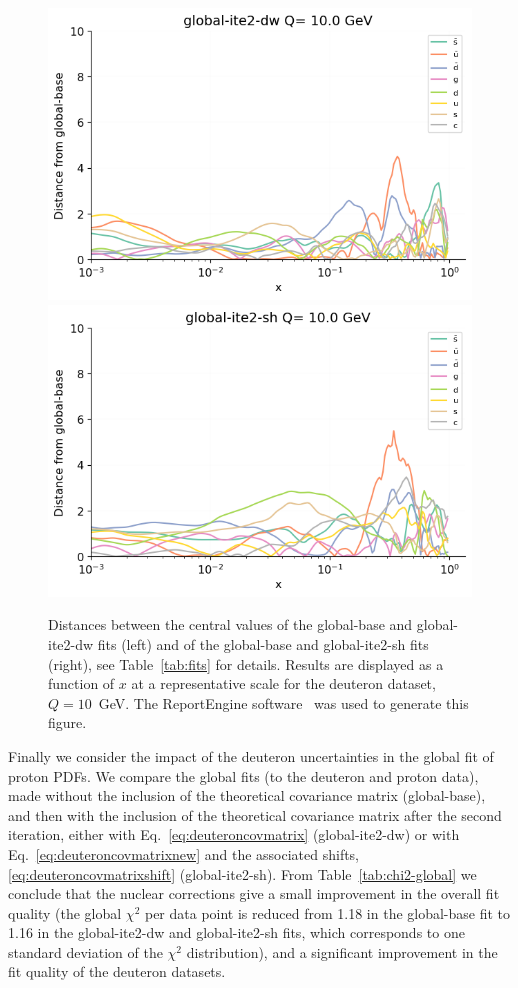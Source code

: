 \documentclass[11pt,a4paper]{article}
\begin{document}
\begin{figure}[!t]
\centering
\includegraphics[width=0.49\linewidth]{plots/distanceb00c03.png}
\includegraphics[width=0.49\linewidth]{plots/distanceb00c04.png}\\
\caption{Distances between the central values of the global-base and
  global-ite2-dw fits (left) and of the global-base and global-ite2-sh fits
  (right), see Table~\ref{tab:fits} for details. Results are displayed as a
  function of $x$ at a representative scale for the deuteron dataset,
  $Q=10$~GeV. The {\sc ReportEngine} software~\cite{zahari_kassabov_2019_2571601} was used to
generate this figure.}
\label{fig:distances_impact}
\end{figure}

Finally we consider the impact of the deuteron uncertainties in the global fit
of proton PDFs. We compare the global fits (to the deuteron and proton data),
made without the inclusion of the theoretical covariance matrix (global-base),
and then with the inclusion of the theoretical covariance matrix after the
second iteration, either with Eq.~\eqref{eq:deuteroncovmatrix} (global-ite2-dw)
or with Eq.~\eqref{eq:deuteroncovmatrixnew} and the associated shifts,
\eqref{eq:deuteroncovmatrixshift} (global-ite2-sh).
From Table~\ref{tab:chi2-global} we conclude that the nuclear corrections give a
small improvement in the overall fit quality (the global $\chi^2$ per data
point is reduced from 1.18 in the global-base fit to 1.16 in the
global-ite2-dw and global-ite2-sh fits, which corresponds to one standard
deviation of the $\chi^2$ distribution), and a significant improvement in the
fit quality of the deuteron datasets. 
\end{document}
